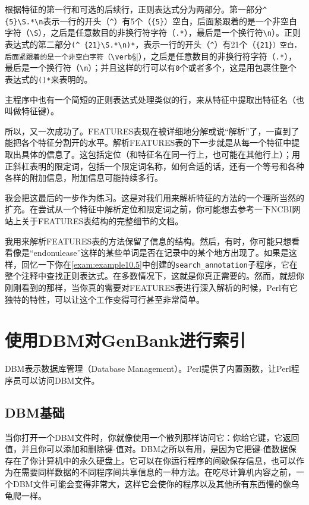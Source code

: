 根据特征的第一行和可选的后续行，正则表达式分为两部分。第一部分\verb|^ {5}\S.*\n|表示一行的开头（\verb|^|）有5个（\verb|{5}|）空白，后面紧跟着的是一个非空白字符（\verb|\S|），之后是任意数目的非换行符字符（\verb|.*|），最后是一个换行符\verb|\n|）。正则表达式的第二部分\verb|(^ {21}\S.*\n)*|，表示一行的开头（\verb|^|）有21个（\verb|{21}）空白，后面紧跟着的是一个非空白字符（\verb|\S|），之后是任意数目的非换行符字符（\verb|.*|），最后是一个换行符（\verb|\n|）；并且这样的行可以有\verb|0|个或者多个，这是用包裹住整个表达式的\verb|()*|来表明的。

主程序中也有一个简短的正则表达式处理类似的行，来从特征中提取出特征名（也叫做特征键）。

所以，又一次成功了。FEATURES表现在被详细地分解或说“解析”了，一直到了能把各个特征分割开的水平。解析FEATURES表的下一步就是从每一个特征中提取出具体的信息了。这包括定位（和特征名在同一行上，也可能在其他行上）；用正斜杠表明的限定词，包括一个限定词名称，如何合适的话，还有一个等号和各种各样的附加信息，附加信息可能持续多行。

我会把这最后的一步作为练习。这是对我们用来解析特征的方法的一个理所当然的扩充。在尝试从一个特征中解析定位和限定词之前，你可能想去参考一下NCBI网站上关于FEATURES表结构的完整细节的文档。

我用来解析FEATURES表的方法保留了信息的结构。然后，有时，你可能只想看看像是“endonulease”这样的某些单词是否在记录中的某个地方出现了。如果是这样，回忆一下你在\autoref{exam:example10.5}中创建的\verb|search_annotation|子程序，它在整个注释中查找正则表达式。在多数情况下，这就是你真正需要的。然而，就想你刚刚看到的那样，当你真的需要对FEATURES表进行深入解析的时候，Perl有它独特的特性，可以让这个工作变得可行甚至非常简单。

\section{使用DBM对GenBank进行索引}
DBM表示数据库管理（Database
Management）。Perl提供了内置函数，让Perl程序员可以访问DBM文件。

\subsection{DBM基础}
当你打开一个DBM文件时，你就像使用一个散列那样访问它：你给它键，它返回值，并且你可以添加和删除键-值对。DBM之所以有用，是因为它把键-值数据保存在了你计算机中的永久硬盘上。它可以在你运行程序的间歇保存信息，也可以作为在需要同样数据的不同程序间共享信息的一种方法。在吃尽计算机内容之前，一个DBM文件可能会变得非常大，这样它会使你的程序以及其他所有东西慢的像乌龟爬一样。

